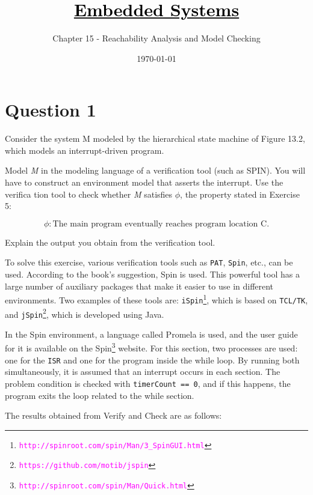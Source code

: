 \documentclass[12pt]{article}
\title{\href{https://github.com/M-Sc-AUT/M.Sc-Computer-Architecture/tree/main/Embedded Systems Modeling and Design}{\textcolor{black}{Embedded Systems}}}
\subtitle{Chapter 15 - Reachability Analysis and Model Checking}
\date{\today}
\begin{document}
\maketitlepage
\maketitlestart







\section{Question 1}
Consider the system M modeled by the hierarchical state machine of Figure 13.2,
which models an interrupt-driven program.

Model \textit{M} in the modeling language of a verification tool (such as SPIN). You will
have to construct an environment model that asserts the interrupt. Use the verifica
tion tool to check whether \textit{M} satisfies $\phi$, the property stated in Exercise 5:

$$ \phi: \text{The main program eventually reaches program location C.} $$

Explain the output you obtain from the verification tool.



\begin{qsolve}
	To solve this exercise, various verification tools such as \texttt{PAT}, \texttt{Spin}, etc., can be used. According to the book's suggestion, Spin is used. This powerful tool has a large number of auxiliary packages that make it easier to use in different environments. Two examples of these tools are: \texttt{iSpin\footnote{\textcolor{magenta}{\texttt{http://spinroot.com/spin/Man/3\_SpinGUI.html}}}}, which is based on \texttt{TCL/TK}, and \texttt{jSpin\footnote{\textcolor{magenta}{\texttt{https://github.com/motib/jspin}}}}, which is developed using Java.
	
	In the Spin environment, a language called Promela is used, and the user guide for it is available on the Spin\footnote{\textcolor{magenta}{\texttt{http://spinroot.com/spin/Man/Quick.html}}} website. For this section, two processes are used: one for the \texttt{ISR} and one for the program inside the while loop. By running both simultaneously, it is assumed that an interrupt occurs in each section. The problem condition is checked with \texttt{timerCount == 0}, and if this happens, the program exits the loop related to the while section.
	
	The results obtained from Verify and Check are as follows:
\end{qsolve}
\end{document}
